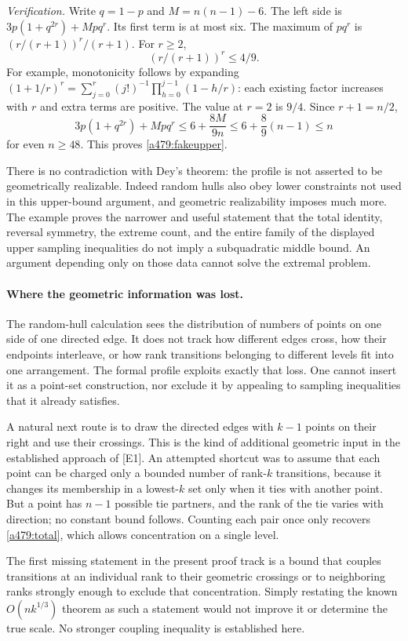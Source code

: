 \documentclass[11pt]{article}
\begin{document}
\emph{Verification.} Write $q=1-p$ and $M=n(n-1)-6$. The left side is
$3p(1+q^{2r})+Mpq^r$. Its first term is at most six. The maximum of
$pq^r$ is $(r/(r+1))^r/(r+1)$. For $r\geq2$,
\[
                  (r/(r+1))^r\leq4/9.
\]
For example, monotonicity follows by expanding
$(1+1/r)^r=\sum_{j=0}^r(j!)^{-1}\prod_{h=0}^{j-1}(1-h/r)$:
each existing factor increases with $r$ and extra terms are positive.
The value at $r=2$ is $9/4$. Since $r+1=n/2$,
\[
 3p(1+q^{2r})+Mpq^r
 \leq6+\frac{8M}{9n}
 \leq6+\frac89(n-1)\leq n
\]
for even $n\geq48$. This proves \eqref{a479:fakeupper}.

There is no contradiction with Dey's theorem: the profile is not asserted
to be geometrically realizable. Indeed random hulls also obey lower
constraints not used in this upper-bound argument, and geometric
realizability imposes much more. The example proves the narrower and
useful statement that the total identity, reversal symmetry, the extreme
count, and the entire family of the displayed upper sampling inequalities
do not imply a subquadratic middle bound. An argument depending only on
those data cannot solve the extremal problem.

\paragraph{Where the geometric information was lost.}
The random-hull calculation sees the distribution of numbers of points on
one side of one directed edge. It does not track how different edges cross,
how their endpoints interleave, or how rank transitions belonging to
different levels fit into one arrangement. The formal profile exploits
exactly that loss. One cannot insert it as a point-set construction, nor
exclude it by appealing to sampling inequalities that it already satisfies.

A natural next route is to draw the directed edges with $k-1$ points on
their right and use their crossings. This is the kind of additional
geometric input in the established approach of [E1]. An attempted shortcut
was to assume that each point can be charged only a bounded number of
rank-$k$ transitions, because it changes its membership in a lowest-$k$
set only when it ties with another point. But a point has $n-1$ possible
tie partners, and the rank of the tie varies with direction; no constant
bound follows. Counting each pair once only recovers
\eqref{a479:total}, which allows concentration on a single level.

The first missing statement in the present proof track is a bound that
couples transitions at an individual rank to their geometric crossings
or to neighboring ranks strongly enough to exclude that concentration.
Simply restating the known $O(nk^{1/3})$ theorem as such a statement
would not improve it or determine the true scale. No stronger coupling
inequality is established here.
\end{document}
